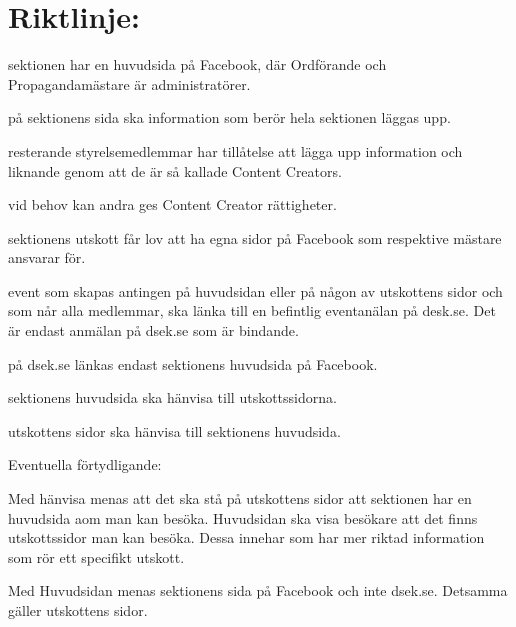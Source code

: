 \documentclass{dsekprotokoll}
\begin{document}
\section{Riktlinje:}
\begin{attlista}
	\item sektionen har en huvudsida på Facebook, där Ordförande och Propagandamästare är
	administratörer.
	\item på sektionens sida ska information som berör hela sektionen läggas upp.
	\item resterande styrelsemedlemmar har tillåtelse att lägga upp information och liknande genom att de är så kallade Content Creators.
	\item vid behov kan andra ges Content Creator rättigheter.
	\item  sektionens utskott får lov att ha egna sidor på Facebook som respektive mästare ansvarar
	för.
	\item event som skapas antingen på huvudsidan eller på någon av utskottens sidor och som
	når alla medlemmar, ska länka till en befintlig eventanälan på desk.se. Det är endast anmälan på dsek.se som är bindande.
	\item på dsek.se länkas endast sektionens huvudsida på Facebook.
	\item sektionens huvudsida ska hänvisa till utskottssidorna.
	\item utskottens sidor ska hänvisa till sektionens huvudsida.

\end{attlista}

Eventuella förtydligande:

Med hänvisa menas att det ska stå på utskottens sidor att sektionen har en huvudsida aom man
kan besöka. Huvudsidan ska visa besökare att det finns utskottssidor man kan besöka. Dessa
innehar som har mer riktad information som rör ett specifikt utskott.

Med Huvudsidan menas sektionens sida på Facebook och inte dsek.se. Detsamma gäller utskottens sidor.

\end{document}
